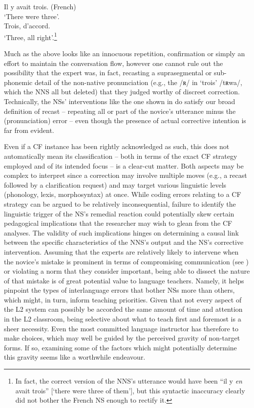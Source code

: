 \documentclass[output=paper,colorlinks,citecolor=brown,modfonts,nonflat]{../langscibook}
\begin{document}
\ea\label{ex:scheuer:10}
{\NNS} {Il} {y} {avait} {trois.}  (French)\\
‘There were three’.\\
{\NS} {Trois,} {d’accord.}\\
‘Three, all right’.\footnote{ {In fact, the correct version of the NNS’s utterance would have been “il y} {\textit{en}} {avait trois” [‘there were three of them’], but this syntactic inaccuracy clearly did not bother the French NS enough to rectify it.}}
\z


Much as the above looks like an innocuous repetition, confirmation or simply an effort to maintain the conversation flow, however one cannot rule out the possibility that the expert was, in fact, recasting a suprasegmental or sub-phonemic detail of the non-native pronunciation (e.g., the /ʀ/ in ‘trois’ /tʀwa/, which the NNS all but deleted) that they judged worthy of discreet correction. Technically, the NSs’ interventions like the one shown in  do satisfy our broad definition of recast – repeating all or part of the novice’s utterance minus the (pronunciation) error – even though the presence of actual corrective intention is far from evident.



Even if a CF instance has been rightly acknowledged as such, this does not automatically mean its classification – both in terms of the exact CF strategy employed and of its intended focus – is a clear-cut matter. Both aspects may be complex to interpret since a correction may involve multiple moves (e.g., a recast followed by a clarification request) and may target various linguistic levels (phonology, lexis, morphosyntax) at once. While coding errors relating to a CF strategy can be argued to be relatively inconsequential, failure to identify the linguistic trigger of the NS’s remedial reaction could potentially skew certain pedagogical implications that the researcher may wish to glean from the CF analyses. The validity of such implications hinges on determining a causal link between the specific characteristics of the NNS’s output and the NS’s corrective intervention. Assuming that the experts are relatively likely to intervene when the novice’s mistake is prominent in terms of compromising communication (see ) or violating a norm that they consider important, being able to dissect the nature of that mistake is of great potential value to language teachers. Namely, it helps pinpoint the types of interlanguage errors that bother NSs more than others, which might, in turn, inform teaching priorities. Given that not every aspect of the L2 system can possibly be accorded the same amount of time and attention in the L2 classroom, being selective about what to teach first and foremost is a sheer necessity. Even the most committed language instructor has therefore to make choices, which may well be guided by the perceived gravity of non-target forms. If so, examining some of the factors which might potentially determine this gravity seems like a worthwhile endeavour.
\end{document}
